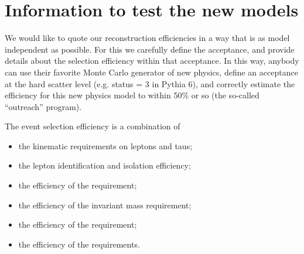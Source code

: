 \section{Information to test the new models}
\label{sect:model}
We would like to quote our reconstruction efficiencies in a way that is as model independent as possible. For this
we carefully define the acceptance, and provide details about the selection efficiency within that acceptance. In
this way, anybody can use their favorite Monte Carlo generator of new physics, define an acceptance at the hard
scatter level (e.g. status = 3 in Pythia 6), and correctly estimate the efficiency for this new physics model to within
50\% or so (the so-called ``outreach'' program).

The event selection efficiency is a combination of
\begin{itemize}
\item the kinematic requirements on leptons and taus;
\item the lepton identification and isolation efficiency;
\item the efficiency of the \MPT requirement;
\item the efficiency of the invariant mass requirement;
\item the efficiency of the \mttwo requirement;
\item the efficiency of the \mt requirements.
\end{itemize}


